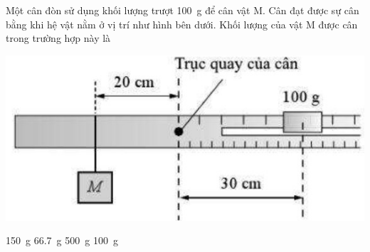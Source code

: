 \begin{ex}
Một cân đòn sử dụng khối lượng trượt \SI{100}{\gram} để cân vật M. Cân đạt được sự cân bằng khi hệ vật nằm ở vị trí như hình bên dưới. Khối lượng của vật M được cân trong trường hợp này là
\begin{center}
	\includegraphics[scale=0.6]{../figs/D10-KTTX3-002-5}
\end{center}
		\choice
		{\True \SI{150}{\gram}}
		{\SI{66.7}{\gram}}
		{\SI{500}{\gram}}
		{\SI{100}{\gram}}
	\loigiai{}
\end{ex}
